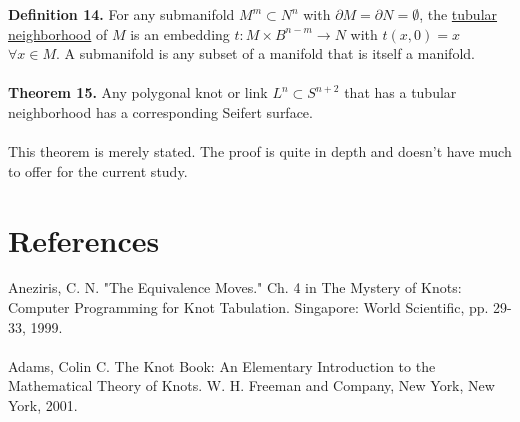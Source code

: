 \documentclass{article}
\begin{document}
\textbf{Definition 14.} For any submanifold $M^m \subset N^n$ with $\partial M = \partial N = \emptyset$, the \underline{tubular neighborhood} of $M$ is an embedding $t: M \times B^{n-m} \rightarrow N$ with $t(x,0) = x$ $\forall x \in M$.  A submanifold is any subset of a manifold that is itself a manifold.
\\
\\
\textbf{Theorem 15.} Any polygonal knot or link $L^n \subset S^{n+2}$ that has a tubular neighborhood has a corresponding Seifert surface.
\\
\\
This theorem is merely stated.  The proof is quite in depth and doesn't have much to offer for the current study. 



























































\clearpage
\section{References}
Aneziris, C. N. "The Equivalence Moves." Ch. 4 in The Mystery of Knots: Computer Programming for Knot Tabulation. Singapore: World Scientific, pp. 29-33, 1999. 
\\
\\
Adams,  Colin  C.
The Knot Book: An Elementary Introduction to the
Mathematical Theory of Knots.
W. H. Freeman and Company, New York,
New York, 2001.
\end{document}

